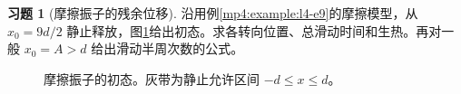 \documentclass[11pt,openany,fontset=fandol]{ctexbook}
\theoremstyle{definition}\newtheorem{example}{例}[chapter]\newtheorem{exercise}{习题}[chapter]
\begin{document}
\par\medskip\noindent\begin{minipage}{\textwidth}
\begin{exercise}[摩擦振子的残余位移]\label{mp4:exercise:l4-h11}
沿用例\ref{mp4:example:l4-e9}的摩擦模型，从 $x_0=9d/2$ 静止释放，图\ref{mp4:fig:l4-h11-q}给出初态。求各转向位置、总滑动时间和生热。再对一般 $x_0=A>d$ 给出滑动半周次数的公式。
\end{exercise}

\begin{figure}[H]\centering
{}
\caption{摩擦振子的初态。灰带为静止允许区间 $-d\le x\le d$。}\label{mp4:fig:l4-h11-q}
\end{figure}
\end{minipage}\par\medskip
\end{document}
